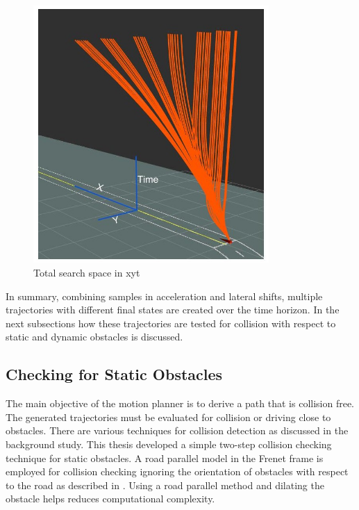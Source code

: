  \begin{figure}
	\centering
	\includegraphics[width=0.8\textwidth]{Images/concept/searchspace2.jpg}
	\caption{Total search space in xyt}
	\label{searchspace}
\end{figure}



In summary, combining samples in acceleration and lateral shifts, multiple trajectories with different final states are created over the time horizon. In the next subsections how these trajectories are tested for collision with respect to static and dynamic obstacles is discussed. 


\subsection{Checking for Static Obstacles} \label{osbtacle_check_satic}
The main objective of the motion planner is to derive a path that is collision free. The generated trajectories must be evaluated for collision or driving close to obstacles. There are various techniques for collision detection as discussed in the background study. This thesis developed a simple two-step collision checking technique for static obstacles. A road parallel model in the Frenet frame is employed for collision checking ignoring the orientation of obstacles with respect to the road as described in \cite{cmu_parallel_thesis}. Using a road parallel method and dilating the obstacle helps reduces computational complexity. 

